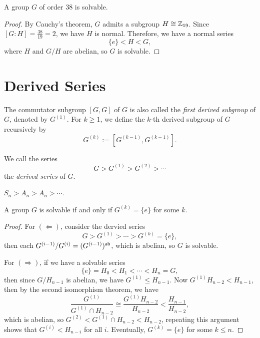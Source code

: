 \begin{example}
  A group \(G\) of order \(38\) is solvable.
\end{example}
\begin{proof}
  By Cauchy's theorem, \(G\) admits a subgroup \(H \cong \mathbb{Z}_{19}\). Since \([G:H] = \frac{38}{19} = 2\), we have \(H\) is normal. Therefore, we have a normal series \[
    \{e\} < H < G,
  \] where \(H\) and \(G/H\) are abelian, so \(G\) is solvable.
\end{proof}
  
\section{Derived Series}

The commutator subgroup \([G,G]\) of \(G\) is also called the \emph{first derived subgroup} of \(G\), denoted by \(G^{(1)}\). For \(k\geq 1\), we define the \(k\)-th derived subgroup of \(G\) recursively by \[
  G^{(k)} := [G^{(k-1)}, G^{(k-1)}].
\]

\begin{definition}
  We call the series \[
    G > G^{(1)} > G^{(2)} > \cdots
  \] the \emph{derived series} of \(G\).
\end{definition}

\begin{example}
  \(S_n > A_n > A_n > \cdots\).
\end{example}

\begin{proposition}
  A group \(G\) is solvable if and only if \(G^{(k)} = \{e\}\) for some \(k\).
\end{proposition}
\begin{proof}
  For \((\Leftarrow)\), consider the dervied series \[
    G > G^{(1)} > \cdots > G^{(k)} = \{e\},
  \] then each \(G^{(i-1)}/G^{(i)} = (G^{(i-1)})^{\mathsf{ab}}\), which is abelian, so \(G\) is solvable.

  For \((\Rightarrow)\), if we have a solvable series \[
    \{e\} = H_0 < H_1 < \cdots < H_n = G,
  \] then since \(G/H_{n-1}\) is abelian, we have \(G^{(1)}\leq H_{n-1}\).
  Now \(G^{(1)}H_{n-2} < H_{n-1}\), then by the second isomorphism theorem, we have \[
    \frac{G^{(1)}}{G^{(1)}\cap H_{n-2}} \cong \frac{G^{(1)}H_{n-2}}{H_{n-2}} < \frac{H_{n-1}}{H_{n-2}},
  \] which is abelian, so \(G^{(2)} < G^{(1)}\cap H_{n-2} < H_{n-2}\), repeating this argument shows that \(G^{(i)} < H_{n-i}\) for all \(i\). Eventually, \(G^{(k)} = \{e\}\) for some \(k\leq n\).
\end{proof}

